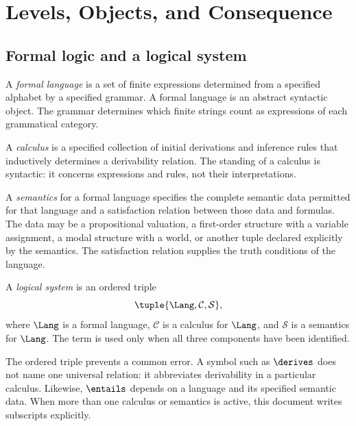 \chapter{Levels, Objects, and Consequence}
\label{ch:levels}

\section{Formal logic and a logical system}
\label{sec:levels-01}

\begin{definition}
A \emph{formal language} is a set of finite expressions determined from a
specified alphabet by a specified grammar.  A formal language is an abstract
syntactic object.  The grammar determines which finite strings count as
expressions of each grammatical category.
\end{definition}

\begin{definition}[Calculus]
A \emph{calculus} is a specified collection of initial derivations and
inference rules that inductively determines a derivability relation.  The
standing of a calculus is syntactic: it concerns expressions and rules, not
their interpretations.
\end{definition}

\begin{definition}[Semantics]
A \emph{semantics} for a formal language specifies the complete semantic data
permitted for that language and a satisfaction relation between those data and
formulas.  The data may be a propositional valuation, a first-order structure
with a variable assignment, a modal structure with a world, or another tuple
declared explicitly by the semantics.  The satisfaction relation supplies the
truth conditions of the language.
\end{definition}

\begin{definition}
A \emph{logical system} is an ordered triple
\[
  \tuple{\Lang,\mathcal C,\mathcal S},
\]
where \(\Lang\) is a formal language, \(\mathcal C\) is a calculus for
\(\Lang\), and \(\mathcal S\) is a semantics for \(\Lang\).  The term is used
only when all three components have been identified.
\end{definition}

The ordered triple prevents a common error.  A symbol such as \(\derives\)
does not name one universal relation: it abbreviates derivability in a
particular calculus.  Likewise, \(\entails\) depends on a language and its
specified semantic data.  When more than one calculus or semantics is active,
this document writes subscripts explicitly.

